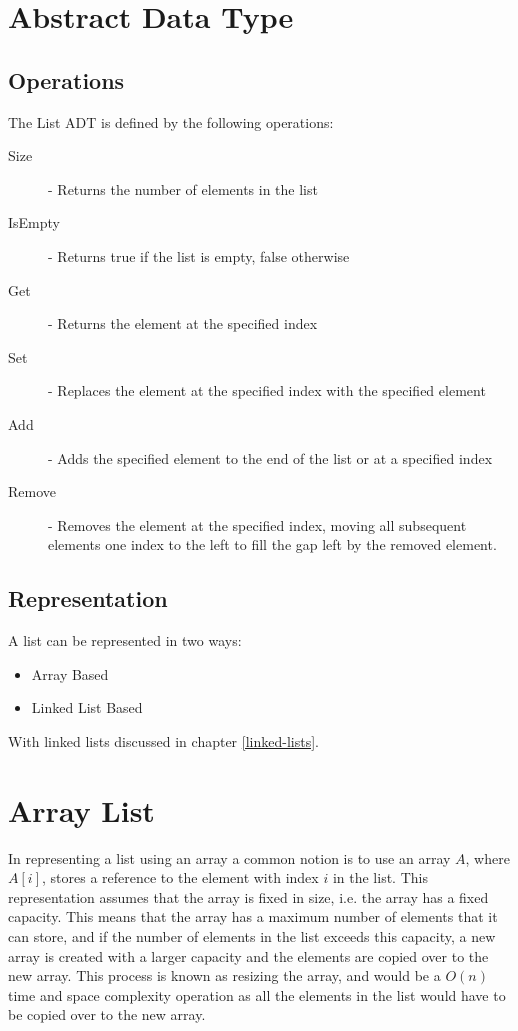 \documentclass[12pt letter]{report}
\begin{document}
\section{Abstract Data Type}

\subsection{Operations}
The List ADT is defined by the following operations:

\begin{description}
  \item[Size] - Returns the number of elements in the list
  \item[IsEmpty] - Returns true if the list is empty, false otherwise
  \item[Get] - Returns the element at the specified index
  \item[Set] - Replaces the element at the specified index with the specified element
  \item[Add] - Adds the specified element to the end of the list or at a specified index
  \item[Remove] - Removes the element at the specified index, moving all subsequent elements one index to the left to
        fill the gap left by the removed element.
\end{description}

\subsection{Representation}

A list can be represented in two ways:
\begin{itemize}
  \item Array Based
  \item Linked List Based
\end{itemize}

With linked lists discussed in chapter \ref{linked-lists}.

\section{Array List}

In representing a list using an array a common notion is to use an array $A$, where $A \left[ i \right] $, stores a
reference to the element with index $i$ in the list. This representation assumes that the array is fixed in size, i.e.
the array has a fixed capacity. This means that the array has a maximum number of elements that it can store, and if
the number of elements in the list exceeds this capacity, a new array is created with a larger capacity and the elements
are copied over to the new array. This process is known as resizing the array, and would be a $O \left( n \right) $ time
and space complexity operation as all the elements in the list would have to be copied over to the new array.
\end{document}
